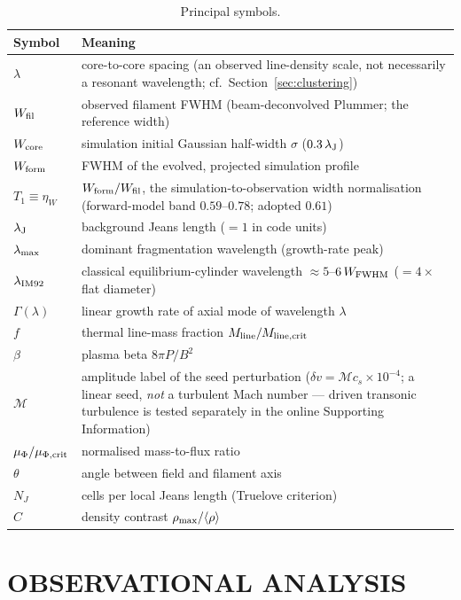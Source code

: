 \documentclass[usenatbib,twoside,twocolumn]{mnras}
\begin{document}
\begin{table}
\caption{Principal symbols.}
\label{tab:symbols}
\footnotesize
\setlength{\tabcolsep}{4pt}
\begin{tabular}{lp{6.1cm}}
\toprule
Symbol & Meaning \\
\midrule
$\lambda$ & core-to-core spacing (an observed line-density scale, not necessarily a resonant wavelength; cf.\ Section~\ref{sec:clustering}) \\
$W_{\rm fil}$ & observed filament FWHM (beam-deconvolved Plummer; the reference width) \\
$W_{\rm core}$ & simulation initial Gaussian half-width $\sigma$ ($0.3\,\lambda_{\rm J}$) \\
$W_{\rm form}$ & FWHM of the evolved, projected simulation profile \\
$T_1\!\equiv\!\eta_W$ & $W_{\rm form}/W_{\rm fil}$, the simulation-to-observation width normalisation (forward-model band $0.59$--$0.78$; adopted $0.61$) \\
$\lambda_{\rm J}$ & background Jeans length ($=1$ in code units) \\
$\lambda_{\rm max}$ & dominant fragmentation wavelength (growth-rate peak) \\
$\lambda_{\rm IM92}$ & classical equilibrium-cylinder wavelength $\approx5$--$6\,W_{\rm FWHM}$ ($=4\times$ flat diameter) \\
$\Gamma(\lambda)$ & linear growth rate of axial mode of wavelength $\lambda$ \\
$f$ & thermal line-mass fraction $M_{\rm line}/M_{\rm line,crit}$ \\
$\beta$ & plasma beta $8\pi P/B^2$ \\
$\mathcal{M}$ & amplitude label of the seed perturbation ($\delta v=\mathcal{M}c_s\times10^{-4}$; a linear seed, \emph{not} a turbulent Mach number --- driven transonic turbulence is tested separately in the online Supporting Information) \\
$\mu_\Phi/\mu_{\Phi,\rm crit}$ & normalised mass-to-flux ratio \\
$\theta$ & angle between field and filament axis \\
$N_J$ & cells per local Jeans length (Truelove criterion) \\
$C$ & density contrast $\rho_{\rm max}/\langle\rho\rangle$ \\
\bottomrule
\end{tabular}
\end{table}

\section{OBSERVATIONAL ANALYSIS}
\end{document}
